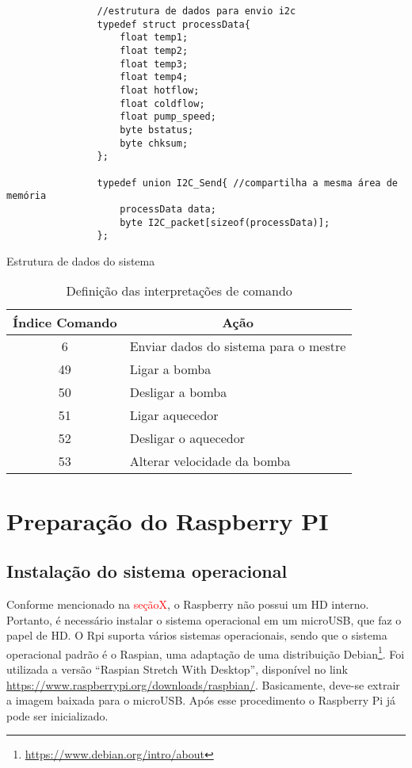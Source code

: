 			\begin{listing}[!htb]
				\begin{verbatim}
				//estrutura de dados para envio i2c
				typedef struct processData{
					float temp1;
					float temp2;
					float temp3;
					float temp4;
					float hotflow;
					float coldflow;
					float pump_speed;
					byte bstatus;
					byte chksum;
				};
				
				typedef union I2C_Send{ //compartilha a mesma área de memória
					processData data;
					byte I2C_packet[sizeof(processData)];
				};				
				\end{verbatim}
				\caption{Estrutura de dados do sistema}
				\label{cod:dadosi2c}
			\end{listing}
		
		\begin{table}[!htb]
			\centering
			\caption{Definição das interpretações de comando}
			\label{tbl5}
			\def\arraystretch{1.3}
			\begin{tabular}{c p{11cm}}
				\hline
				\multicolumn{1}{c}{\textbf{Índice Comando}} & \multicolumn{1}{c}{\textbf{Ação}} \\ \hline
				
				6 & Enviar dados do sistema para o mestre \\
				49 & Ligar a bomba \\ %
				50 & Desligar a bomba \\ %
				51 & Ligar aquecedor \\ %
				52 & Desligar o aquecedor \\ %
				53 & Alterar velocidade da bomba \\ %
				\hline
			\end{tabular}
		\end{table}
		
	\section{Preparação do Raspberry PI}
		\subsection{Instalação do sistema operacional}
			Conforme mencionado na \textcolor{red}{seçãoX}, o Raspberry não possui um HD interno. Portanto, é necessário instalar o sistema operacional em um microUSB, que faz o papel de HD. O Rpi suporta vários sistemas operacionais, sendo que o sistema operacional padrão é o Raspian, uma adaptação de uma distribuição Debian\footnote{\url{https://www.debian.org/intro/about}}. Foi utilizada a versão ``Raspian Stretch With Desktop'', disponível no link \url{https://www.raspberrypi.org/downloads/raspbian/}. Basicamente, deve-se extrair a imagem baixada para o microUSB. Após esse procedimento o Raspberry Pi já pode ser inicializado.
		
